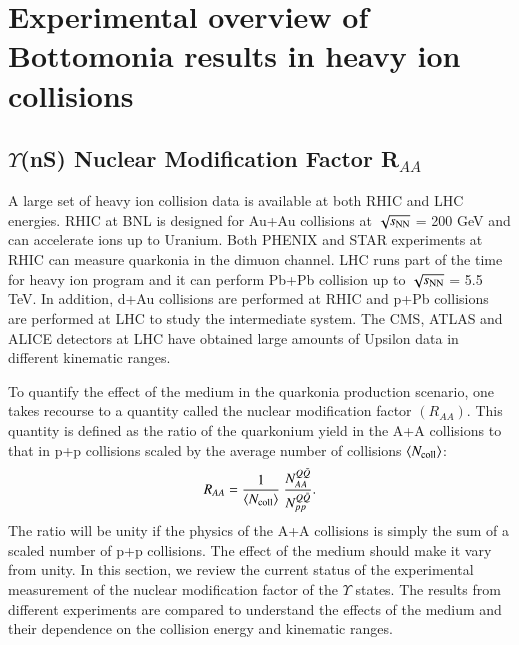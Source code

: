 \section{Experimental overview of Bottomonia results in heavy ion collisions}
\label{Sec:BottAAexp}
\subsection{$\Upsilon$(nS) Nuclear Modification Factor R$_{AA}$}
A large set of heavy ion collision data is available at both RHIC and LHC energies.
RHIC at BNL is designed for Au+Au collisions
at $\sqrt{s_{\rm NN}}$ = 200 GeV and can accelerate ions up to Uranium. Both PHENIX and
STAR experiments at RHIC can measure quarkonia in the dimuon channel. 
LHC runs part of the time for heavy ion program and it can perform Pb+Pb collision
up to $\sqrt{s_{\rm NN}}$ = 5.5 TeV. In addition, d+Au collisions
are performed at RHIC and p+Pb collisions are performed at LHC to study the 
intermediate system. The CMS, ATLAS and ALICE detectors at LHC have obtained large
amounts of Upsilon data in different kinematic ranges.

To quantify the effect of the medium in the quarkonia production scenario, one takes
recourse to a quantity called the nuclear modification factor $(R_{AA})$. This quantity
is defined as the ratio of the quarkonium yield in the A+A collisions to that
in p+p collisions scaled by the average number of collisions $\langle N_{\rm coll} \rangle$: 
 \begin{equation}
 R_{AA} = \frac{1}{\langle N_{\rm coll} \rangle} \ \frac {N^{Q{\bar Q}}_{AA}} {N^{Q{\bar Q}}_{pp}}.
 \end{equation}
 The ratio will be unity if the physics of the A+A collisions is simply the sum of
 a scaled number of p+p collisions. The effect of the medium should make it vary from unity. 
In this section, we review the current status of the experimental measurement
of the nuclear modification factor of the $\Upsilon$ states. The results from
different experiments are compared to understand the effects of the medium and their
dependence on the collision energy and kinematic ranges. 

